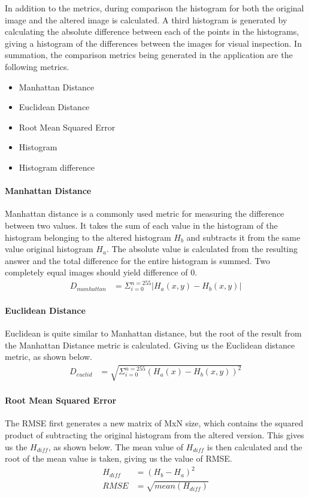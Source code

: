 In addition to the metrics, during comparison the histogram for both the
original image and the altered image is calculated. A third histogram is
generated by calculating the absolute difference between each of the points in
the histograms, giving a histogram of the differences between the images for
visual inspection. In summation, the comparison metrics being generated in the 
application are the following metrics.
\begin{multicols}{3}
\begin{itemize}
	\item Manhattan Distance
	\item Euclidean Distance
	\item Root Mean Squared Error
	\item Histogram
	\item Histogram difference
\end{itemize}
\end{multicols}


\paragraph{Manhattan Distance}
Manhattan distance is a commonly used metric for measuring the difference
between two values. It takes the sum of each value in the histogram of the
histogram belonging to the altered histogram $H_b$ and subtracts it from the
same value original histogram $H_a$.  The absolute value is calculated from the
resulting answer and the total difference for the entire histogram is summed.
Two completely equal images should yield difference of $0$.
\begin{align}
	D_{manhattan} &= \Sigma^{n=255}_{i=0} | H_{a}(x,y) - H_{b}(x,y) |
\end{align}


\paragraph{Euclidean Distance}
Euclidean is quite similar to Manhattan distance, but the root of the result
from the Manhattan Distance metric is calculated. Giving us the Euclidean
distance metric, as shown below.
\begin{align}
	D_{euclid} &= \sqrt{\Sigma^{n=255}_{i=0} (H_a(x) - H_b(x,y))^2}
\end{align}


\paragraph{Root Mean Squared Error}
The RMSE first generates a new matrix of MxN size, which contains the squared
product of subtracting the original histogram from the altered version. This
gives us the $H_{diff}$, as shown below.
The mean value of $H_{diff}$ is then calculated and the root of the mean value
is taken, giving us the value of RMSE.
\begin{align}
	H_{diff} &= (H_b - H_a)^2 \\
	RMSE &= \sqrt{ mean( H_{diff} ) } 
\end{align}


